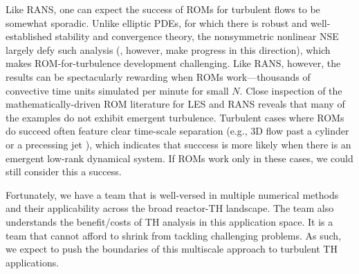 


Like RANS, one can expect the success of ROMs for turbulent flows to
be somewhat sporadic.  
  Unlike elliptic PDEs, for which there is robust and well-established
stability and convergence theory, the nonsymmetric nonlinear NSE
largely defy such analysis (\cite{fick18,patera05}, however, make progress in this
direction), which makes ROM-for-turbulence development challenging.
Like RANS, however, the results can be spectacularly rewarding when ROMs
work---thousands of convective time units simulated per minute for small $N$.
   Close inspection of the mathematically-driven ROM literature for LES and
RANS reveals that many of the examples do not exhibit emergent turbulence.
Turbulent cases where ROMs do succeed often feature clear time-scale separation
(e.g., 3D flow past a cylinder \cite{wells2017evolve} or a precessing jet
\cite{akkari19}), which indicates that succcess is more likely when there 
is an emergent low-rank dynamical system.  If ROMs work only in these
cases, we could still consider this a success.

Fortunately, we have a team that is well-versed in multiple numerical methods
and their applicability across the broad reactor-TH landscape.  The team also
understands the benefit/costs of TH analysis in this application space.  It is
a team that cannot afford to shrink from tackling challenging problems.  As
such, we expect to push the boundaries of this multiscale approach to turbulent 
TH applications.
